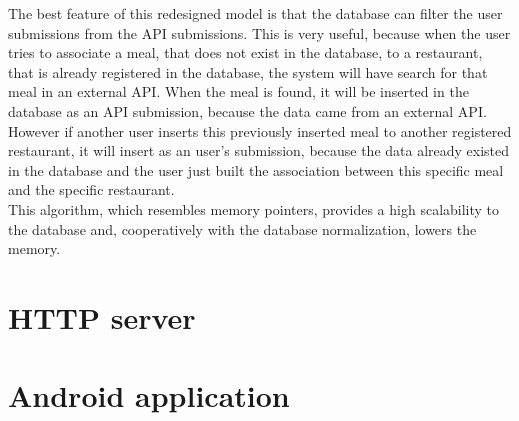 The best feature of this redesigned model is that the database can filter the user submissions from the API submissions. This is very
useful, because when the user tries to associate a meal, that does not exist in the database, to a restaurant, that is already registered
in the database, the system will have search for that meal in an external API. When the meal is found, it will be inserted in the database
as an API submission, because the data came from an external API.\\

However if another user inserts this previously inserted meal to another registered restaurant, it will insert as an user's submission, because
the data already existed in the database and the user just built the association between this specific meal and the specific restaurant.\\

This algorithm, which resembles memory pointers, provides a high scalability to the database and, cooperatively with the database normalization, lowers the memory.

\section{HTTP server}

\section{Android application}
